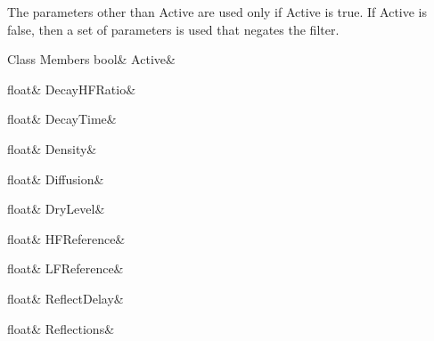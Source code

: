 The parameters other than Active are used only if Active is true. If Active is false, then a set of parameters is used that negates the filter. \begin{DoxyFields}{Class Members}
\mbox{\label{group___event_types_a5696ae11db74364234cfa3a1b392478b}} 
bool&
Active&
\\
\hline

\mbox{\label{group___event_types_af0b0548c6e50ca27a9c7c431536de226}} 
float&
DecayHFRatio&
\\
\hline

\mbox{\label{group___event_types_a0d4f06f9eb253847d91976cf4e890f94}} 
float&
DecayTime&
\\
\hline

\mbox{\label{group___event_types_a50712c619ef5aa8a29743071932f97cf}} 
float&
Density&
\\
\hline

\mbox{\label{group___event_types_a7f0df133bca26a8df749cb4c8a0c2fde}} 
float&
Diffusion&
\\
\hline

\mbox{\label{group___event_types_a7bd1b1132e241d4326e9391ab8725a14}} 
float&
DryLevel&
\\
\hline

\mbox{\label{group___event_types_aef76135465fe5a51b9cdfb0a4c6d7b8e}} 
float&
HFReference&
\\
\hline

\mbox{\label{group___event_types_a7b3168d519f1c20dac8e7c017e421d58}} 
float&
LFReference&
\\
\hline

\mbox{\label{group___event_types_aca80ad03bd9dce72578cba5c10878f97}} 
float&
ReflectDelay&
\\
\hline

\mbox{\label{group___event_types_a6a97ac76aa1503956201878b0517bab7}} 
float&
Reflections&
\\
\hline


\end{DoxyFields}
